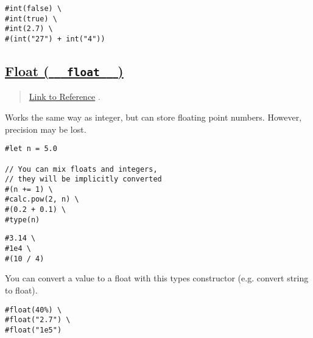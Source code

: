 \begin{verbatim}
#int(false) \
#int(true) \
#int(2.7) \
#(int("27") + int("4"))
\end{verbatim}

\pandocbounded{}

\subsection{\texorpdfstring{\hyperref[float-float]{Float (
\texttt{\ }{\texttt{\ float\ }}\texttt{\ }
)}}{Float (   float   )}}\label{float-float}

\begin{quote}
\href{https://typst.app/docs/reference/foundations/float/}{Link to
Reference} .
\end{quote}

Works the same way as integer, but can store floating point numbers.
However, precision may be lost.

\begin{verbatim}
#let n = 5.0

// You can mix floats and integers, 
// they will be implicitly converted
#(n += 1) \
#calc.pow(2, n) \
#(0.2 + 0.1) \
#type(n) 
\end{verbatim}

\pandocbounded{}

\begin{verbatim}
#3.14 \
#1e4 \
#(10 / 4)
\end{verbatim}

\pandocbounded{}

You can convert a value to a float with this type\textquotesingle s
constructor (e.g. convert string to float).

\begin{verbatim}
#float(40%) \
#float("2.7") \
#float("1e5")
\end{verbatim}

\pandocbounded{}
